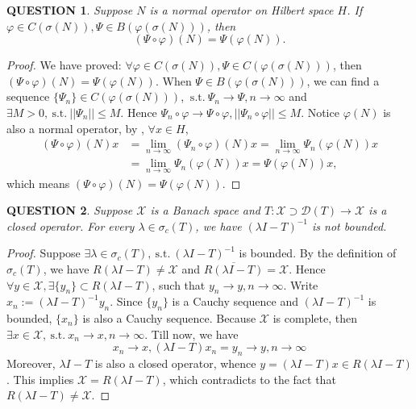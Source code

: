 \documentclass[12pt]{article}
\renewcommand{\(}{\left(}%
\renewcommand{\)}{\right)}%
\renewcommand{\[}{\left[}%
\renewcommand{\]}{\right]}%
\newcommand{\x}{\mathscr{X}}
\newcommand{\st}{\mathrm{\ s.t.\ }}
\newcommand{\li}{\lim\limits_}
\newtheorem{question}{QUESTION}[section]}
\newtheorem{proof}{Proof.}}
\begin{document}
  \begin{question}
   Suppose $N$ is a normal operator on Hilbert space $H$. If $\varphi\in C(\sigma(N) ), \Psi\in B(\varphi(\sigma(N) ) )$, then
   \begin{equation*}
    (\Psi\circ\varphi )(N)=\Psi(\varphi(N) ).
   \end{equation*}
  \end{question}
  \begin{proof}
   We have proved: $\forall \varphi\in C(\sigma(N) ), \Psi\in C(\varphi(\sigma(N) ) )$, then $(\Psi\circ\varphi )(N)=\Psi(\varphi(N) )$. When $\Psi\in B(\varphi(\sigma(N) ) )$, we can find a sequence $\{\Psi_n\}\in C(\varphi(\sigma(N) ) )$, $\st \Psi_n\to \Psi,n\to\infty$ and $\exists M>0,\st ||\Psi_n||\leq M$. Hence $\Psi_n\circ\varphi\to \Psi\circ\varphi,||\Psi_n\circ\varphi||\leq M$. Notice $\varphi(N)$ is also a normal operator, by \cite[Theorem 2.5.20 (iii)]{ref1}, $\forall x\in H$,
   \begin{equation*}
    \begin{split}
     (\Psi\circ\varphi )(N)x&=\li{n\to\infty}(\Psi_n\circ\varphi )(N)x=\li{n\to\infty}\Psi_n(\varphi(N) )x\\
     &=\li{n\to\infty}\Psi_n(\varphi(N) )x=\Psi(\varphi(N) )x,
    \end{split}
   \end{equation*}
   which means $(\Psi\circ\varphi )(N)=\Psi(\varphi(N) )$.
  \end{proof}

  \begin{question}
   Suppose $\x$ is a Banach space and $T:\x\supset \mathscr{D}(T)\to \x$ is a closed operator. For every $\lambda\in\sigma_c(T)$, we have $(\lambda I-T )^{-1}$ is not bounded.
  \end{question}
  \begin{proof}
   Suppose $\exists \lambda\in\sigma_c(T),\st (\lambda I-T )^{-1}$ is bounded. By the definition of $\sigma_c(T)$, we have $R(\lambda I-T )\neq\x$ and $\overline{R(\lambda I-T )}=\x$. Hence $\forall y\in \x,\exists \{y_n\}\subset R(\lambda I-T )$, such that $y_n\to y,n\to\infty$. Write $x_n:=(\lambda I-T )^{-1}y_n$. Since $\{y_n\}$ is a Cauchy sequence and  $(\lambda I-T )^{-1}$ is bounded, $\{x_n\}$ is also a Cauchy sequence. Because $\x$ is complete, then $\exists x\in\x,\st x_n\to x,n\to\infty$. Till now, we have
   \begin{equation*}
    x_n\to x,(\lambda I-T )x_n=y_n\to y,n\to\infty
   \end{equation*}
   Moreover, $\lambda I-T$ is also a closed operator, whence $y=(\lambda I-T )x\in R(\lambda I-T )$. This implies $\x=R(\lambda I-T )$, which contradicts to the fact that $R(\lambda I-T )\neq\x$.
  \end{proof}
\end{document}
